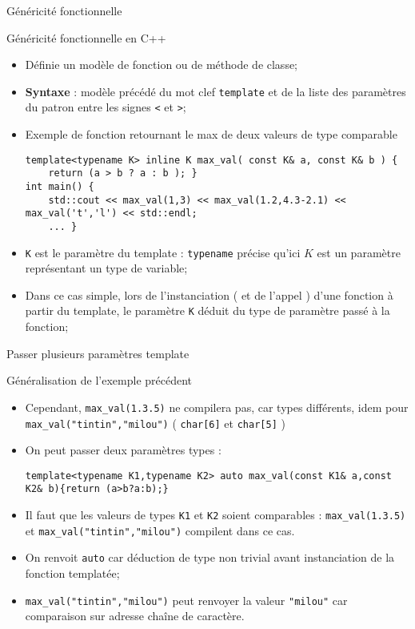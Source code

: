 \documentclass[handout,10pt]{beamer}
\begin{document}
\begin{frame}[fragile]{Généricité fonctionnelle}
\small
\begin{block}{Généricité fonctionnelle en C++}
\begin{itemize}
\item Définie un modèle de fonction ou de méthode de classe;
\item \textbf{Syntaxe} : modèle précédé du mot clef \lstinline$template$ et de la liste des paramètres du patron entre les signes 
\lstinline$<$ et \lstinline$>$;
\item {\color{blue}Exemple de fonction retournant le max de deux valeurs de type comparable}
\begin{lstlisting}
template<typename K> inline K max_val( const K& a, const K& b ) {
    return (a > b ? a : b ); }
int main() {
    std::cout << max_val(1,3) << max_val(1.2,4.3-2.1) << max_val('t','l') << std::endl;
    ... }
\end{lstlisting}
\item \lstinline$K$ est le paramètre du template : \lstinline$typename$ précise qu'ici $K$ est un paramètre représentant un type
de variable;
\item Dans ce cas simple, lors de l'instanciation ( et de l'appel ) d'une fonction à partir du template, le paramètre \lstinline$K$ déduit du type de paramètre passé à la fonction;
\end{itemize}
\end{block}
\end{frame}
\begin{frame}[fragile]{Passer plusieurs paramètres template}
\small
\begin{block}{Généralisation de l'exemple précédent}
\begin{itemize}
\item Cependant, \lstinline$max_val(1.3.5)$ ne compilera pas, car types différents, idem pour \lstinline$max_val("tintin","milou")$ ( \lstinline$char[6]$ et \lstinline$char[5]$ )
\item On peut passer deux paramètres types :
\begin{lstlisting}
template<typename K1,typename K2> auto max_val(const K1& a,const K2& b){return (a>b?a:b);}
\end{lstlisting}
\item Il faut que les valeurs de types \lstinline$K1$ et \lstinline$K2$ soient comparables : \lstinline$max_val(1.3.5)$  et \lstinline$max_val("tintin","milou")$ compilent dans ce cas.
\item On renvoit \lstinline$auto$ car déduction de type non trivial avant instanciation de la fonction templatée;
\item \lstinline$max_val("tintin","milou")$ peut renvoyer la valeur \lstinline$"milou"$ car comparaison sur adresse chaîne de caractère.
\end{itemize}
\end{block}
\end{frame}
\end{document}

